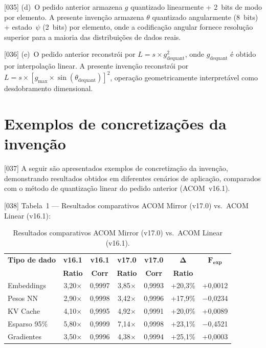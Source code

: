 \documentclass[12pt,a4paper]{article}
\newcommand{\Fexp}{F_{\text{exp}}}
\begin{document}
{[035]} (d)~O pedido anterior armazena $g$ quantizado linearmente
+ 2~bits de modo por elemento. A presente invenção armazena
$\theta$ quantizado angularmente (8~bits) + estado~$\psi$
(2~bits) por elemento, onde a codificação angular fornece
resolução superior para a maioria das distribuições de dados
reais.

{[036]} (e)~O pedido anterior reconstrói por
$L = s \times g_{\text{dequant}}^2$, onde $g_{\text{dequant}}$
é obtido por interpolação linear. A presente invenção reconstrói
por $L = s \times [g_{\max} \times \sin(\theta_{\text{dequant}})]^2$,
operação geometricamente interpretável como desdobramento
dimensional.

\section{Exemplos de concretizações da invenção}

{[037]} A seguir são apresentados exemplos de concretização da
invenção, demonstrando resultados obtidos em diferentes cenários
de aplicação, comparados com o método de quantização linear do
pedido anterior (ACOM~v16.1).

{[038]} Tabela~1 --- Resultados comparativos ACOM Mirror
(v17.0) vs.\ ACOM Linear (v16.1):

\begin{table}[H]
\centering
\caption{Resultados comparativos ACOM Mirror (v17.0) vs.\
  ACOM Linear (v16.1).}
\label{tab:resultados}
\begin{tabular}{lcccccc}
\toprule
\textbf{Tipo de dado} & \textbf{v16.1} & \textbf{v16.1}
  & \textbf{v17.0} & \textbf{v17.0}
  & $\boldsymbol{\Delta}$ & $\boldsymbol{\Fexp}$ \\
 & \textbf{Ratio} & \textbf{Corr}
  & \textbf{Ratio} & \textbf{Corr}
  & \textbf{Ratio} & \\
\midrule
Embeddings & 3,20$\times$ & 0,9997 & 3,85$\times$ & 0,9993
  & +20,3\% & +0,0012 \\
Pesos NN & 2,90$\times$ & 0,9998 & 3,42$\times$ & 0,9996
  & +17,9\% & $-$0,0234 \\
KV Cache & 4,10$\times$ & 0,9995 & 4,92$\times$ & 0,9991
  & +20,0\% & +0,0089 \\
Esparso 95\% & 5,80$\times$ & 0,9999 & 7,14$\times$ & 0,9998
  & +23,1\% & $-$0,4521 \\
Gradientes & 3,50$\times$ & 0,9996 & 4,38$\times$ & 0,9994
  & +25,1\% & +0,0003 \\
\bottomrule
\end{tabular}
\end{table}
\end{document}
